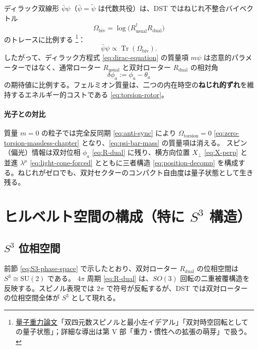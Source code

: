 \documentclass[dvipdfmx,a4paper,oneside]{jsbook}
\numberwithin{equation}{chapter}
\begin{document}
ディラック双線形 \(\bar\psi\psi\)（\(\bar\psi = \widetilde{\psi}\) は代数共役）は、DST ではねじれ不整合バイベクトル
\begin{equation}
  \Omega_{\mathrm{biv}} = \log\!\bigl(R_{\mathrm{usual}}^\dagger R_{\mathrm{dual}}\bigr)
  \label{eq:Omega-biv-log}
\end{equation}
のトレースに比例する \footnote{\hyperref[sec:sister-manuscripts]{量子重力論文}「双四元数スピノルと最小左イデアル」「双対時空回転としての量子状態」；詳細な導出は第 V 部「重力・慣性への拡張の萌芽」で扱う。}：
\begin{equation}
  \bar\psi\psi \propto \operatorname{Tr}(\Omega_{\mathrm{biv}}).
  \label{eq:psi-bar-mass}
\end{equation}
したがって、ディラック方程式 \eqref{eq:dirac-equation} の質量項 \(m\psi\) は恣意的パラメーターではなく、通常ローター \(R_{\mathrm{usual}}\) と双対ローター \(R_{\mathrm{dual}}\) の相対角
\begin{equation}
  \delta\phi_a := \phi_a - \theta_a
  \label{eq:delta-phi}
\end{equation}
の期待値に比例する。フェルミオン質量は、二つの内在時空の\textbf{ねじれ的ずれ}を維持するエネルギー的コストである \eqref{eq:torsion-rotor}。

\paragraph{光子との対比}
質量 \(m = 0\) の粒子では完全反同期 \eqref{eq:anti-sync} により \(\Omega_{\mathrm{torsion}} = 0\) \eqref{eq:zero-torsion-massless-chapter} となり、\eqref{eq:psi-bar-mass} の質量項は消える。
スピン（偏光）情報は双対位相 \(\phi_a\) \eqref{eq:R-dual} に残り、横方向位置 \(X_\perp\) \eqref{eq:X-perp} と並進 \(\lambda^\mu\) \eqref{eq:light-cone-forced} とともに三者構造 \eqref{eq:position-decomp} を構成する。ねじれがゼロでも、双対セクターのコンパクト自由度は量子状態として生き残る。

\section{\texorpdfstring{ヒルベルト空間の構成（特に \(S^3\) 構造）}{ヒルベルト空間の構成（特に S3 構造）}}

\subsection{\texorpdfstring{\(S^3\) 位相空間}{S3 位相空間}}

前節 \eqref{eq:S3-phase-space} で示したとおり、双対ローター \(R_{\mathrm{dual}}\) の位相空間は \(S^3 \cong \mathrm{SU}(2)\) である。
\(4\pi\) 周期 \eqref{eq:R-dual} は、\(SO(3)\) 回転の二重被覆構造を反映する。スピノル表現では \(2\pi\) で符号が反転するが、DST では双対ローターの位相空間全体が \(S^3\) として現れる。
\end{document}
